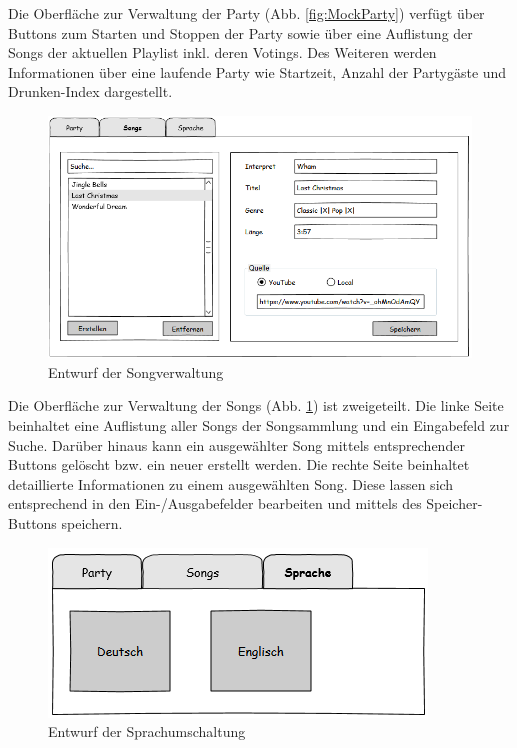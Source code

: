 Die Oberfläche zur Verwaltung der Party (Abb. \ref{fig:MockParty}) verfügt über Buttons zum Starten und Stoppen der Party sowie über eine Auflistung der Songs der aktuellen Playlist inkl. deren Votings. Des Weiteren werden Informationen über eine laufende Party wie Startzeit, Anzahl der Partygäste und Drunken-Index dargestellt.

\begin{figure}[H]
\centering
\includegraphics[width=0.95\linewidth]{Bilder/MockSongVerwaltung}
\caption{Entwurf der Songverwaltung}
\label{fig:MockSongVerwaltung}
\end{figure}

Die Oberfläche zur Verwaltung der Songs (Abb. \ref{fig:MockSongVerwaltung}) ist zweigeteilt. Die linke Seite beinhaltet eine Auflistung aller Songs der Songsammlung und ein Eingabefeld zur Suche. Darüber hinaus kann ein ausgewählter Song mittels entsprechender Buttons gelöscht bzw. ein neuer erstellt werden. Die rechte Seite 
beinhaltet detaillierte Informationen zu einem ausgewählten Song. Diese lassen sich entsprechend in den Ein-/Ausgabefelder bearbeiten und mittels des Speicher-Buttons speichern.

\begin{figure}[H]
\centering
\includegraphics[width=0.7\linewidth]{Bilder/MockSprachen}
\caption{Entwurf der Sprachumschaltung}
\label{fig:MockSprachen}
\end{figure}

